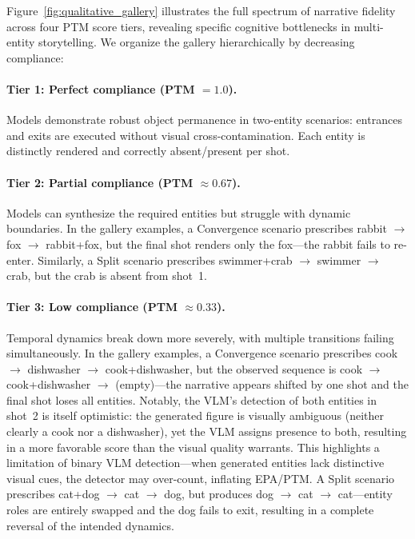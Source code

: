 \documentclass[sigconf,review,anonymous]{acmart}
\begin{document}
Figure~\ref{fig:qualitative_gallery} illustrates the full spectrum of narrative fidelity across four PTM score tiers, revealing specific cognitive bottlenecks in multi-entity storytelling. We organize the gallery hierarchically by decreasing compliance:

\paragraph{Tier 1: Perfect compliance (\textcolor{green!50!black}{PTM $= 1.0$}).}
Models demonstrate robust object permanence in two-entity scenarios: entrances and exits are executed without visual cross-contamination. Each entity is distinctly rendered and correctly absent/present per shot.

\paragraph{Tier 2: Partial compliance (\textcolor{orange!80!black}{PTM $\approx 0.67$}).}
Models can synthesize the required entities but struggle with dynamic boundaries. In the gallery examples, a Convergence scenario prescribes rabbit $\to$ fox $\to$ rabbit+fox, but the final shot renders only the fox---the rabbit fails to re-enter. Similarly, a Split scenario prescribes swimmer+crab $\to$ swimmer $\to$ crab, but the crab is absent from shot~1.

\paragraph{Tier 3: Low compliance (\textcolor{red!70!black}{PTM $\approx 0.33$}).}
Temporal dynamics break down more severely, with multiple transitions failing simultaneously. In the gallery examples, a Convergence scenario prescribes cook $\to$ dishwasher $\to$ cook+dishwasher, but the observed sequence is cook $\to$ cook+dishwasher $\to$ (empty)---the narrative appears shifted by one shot and the final shot loses all entities. Notably, the VLM's detection of both entities in shot~2 is itself optimistic: the generated figure is visually ambiguous (neither clearly a cook nor a dishwasher), yet the VLM assigns presence to both, resulting in a more favorable score than the visual quality warrants. This highlights a limitation of binary VLM detection---when generated entities lack distinctive visual cues, the detector may over-count, inflating EPA/PTM. A Split scenario prescribes cat+dog $\to$ cat $\to$ dog, but produces dog $\to$ cat $\to$ cat---entity roles are entirely swapped and the dog fails to exit, resulting in a complete reversal of the intended dynamics.
\end{document}
